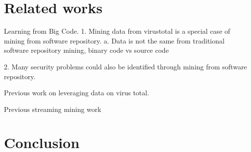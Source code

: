 \section{Related works}

Learning from Big Code. 
1. Mining data from virustotal is a special case of  mining from software repository. 
a. Data is not the same from traditional software repository mining, binary code vs source code

2. Many security problems could also be identified through mining from software repository. 

Previous work on leveraging data on virus total. 

Previous streaming mining work

\section{Conclusion}
